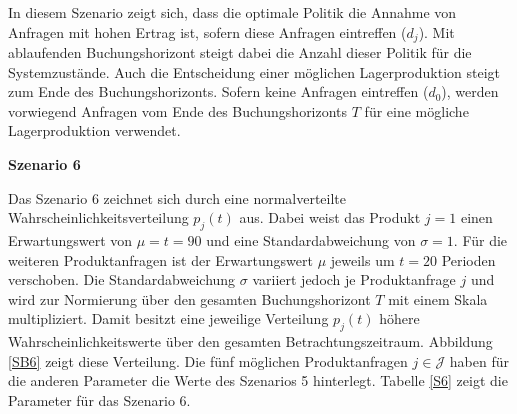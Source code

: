 In diesem Szenario zeigt sich, dass die optimale Politik die Annahme von Anfragen mit hohen Ertrag ist, sofern diese Anfragen eintreffen ($d_j$). Mit ablaufenden Buchungshorizont steigt dabei die Anzahl dieser Politik für die Systemzustände. Auch die Entscheidung einer möglichen Lagerproduktion steigt zum Ende des Buchungshorizonts. Sofern keine Anfragen eintreffen ($d_0$), werden vorwiegend Anfragen vom Ende des Buchungshorizonts $T$ für eine mögliche Lagerproduktion verwendet.

\textbf{Szenario 6}

Das Szenario 6 zeichnet sich durch eine normalverteilte Wahrscheinlichkeitsverteilung $p_j(t)$ aus. Dabei weist das Produkt $j=1$ einen Erwartungswert von $\mu=t=90$ und eine Standardabweichung von $\sigma=1$. Für die weiteren Produktanfragen ist der Erwartungswert $\mu$ jeweils um $t=20$ Perioden verschoben. Die Standardabweichung $\sigma$ variiert jedoch je Produktanfrage $j$ und wird zur Normierung über den gesamten Buchungshorizont $T$ mit einem Skala multipliziert. Damit besitzt eine jeweilige Verteilung $p_j(t)$ höhere Wahrscheinlichkeitswerte über den gesamten Betrachtungszeitraum. Abbildung \ref{SB6} zeigt diese Verteilung. Die fünf möglichen Produktanfragen $j\in\mathcal{J}$ haben für die anderen Parameter die Werte des Szenarios 5 hinterlegt. Tabelle \ref{S6} zeigt die Parameter für das Szenario 6.

